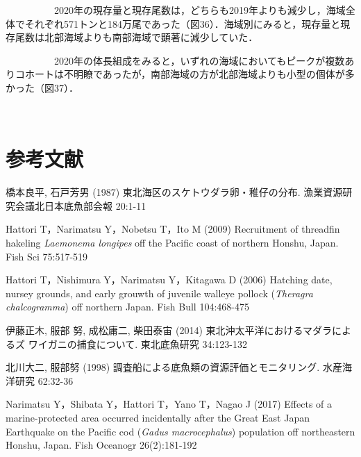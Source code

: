 \documentclass[11pt]{article} %
\begin{document}
\begin{linenumbers}
\ \ \ \ \ \ \ \ \ \ 
2020年の現存量と現存尾数は，どちらも2019年よりも減少し，海域全体でそれぞれ571トンと184万尾であった（図36）．海域別にみると，現存量と現存尾数は北部海域よりも南部海域で顕著に減少していた．


\ \ \ \ \ \ \ \ \ \ 
2020年の体長組成をみると，いずれの海域においてもピークが複数ありコホートは不明瞭であったが，南部海域の方が北部海域よりも小型の個体が多かった（図37）．

\ \ \ \ \ \ \ \ \ \ 
\section{参考文献}
\hangindent=30pt
\noindent
橋本良平, 石戸芳男 (1987) 東北海区のスケトウダラ卵・稚仔の分布. 漁業資源研究会議北日本底魚部会報 20:1-11

\hangindent=30pt
\noindent
Hattori T，Narimatsu Y，Nobetsu T，Ito M (2009) Recruitment of threadfin hakeling \textit{Laemonema longipes} off the Pacific coast of northern Honshu, Japan. Fish Sci 75:517-519

\hangindent=30pt
\noindent
Hattori T，Nishimura Y，Narimatsu Y，Kitagawa D (2006) Hatching date, nursey grounds, and early grouwth of juvenile walleye pollock (\textit{Theragra chalcogramma}) off northern Japan. Fish Bull 104:468-475


\hangindent=30pt
\noindent
伊藤正木, 服部 努, 成松庸二, 柴田泰宙 (2014) 東北沖太平洋におけるマダラによるズ
ワイガニの捕食について. 東北底魚研究 34:123-132

\hangindent=30pt
\noindent
北川大二, 服部努 (1998) 調査船による底魚類の資源評価とモニタリング. 水産海洋研究 62:32-36


\hangindent=30pt
\noindent
Narimatsu Y，Shibata Y，Hattori T，Yano T，Nagao J (2017) Effects of a marine-protected area occurred incidentally after the Great East Japan Earthquake on the Pacific cod (\textit{Gadus macrocephalus}) population off northeastern Honshu, Japan. Fish Oceanogr 26(2):181-192


\end{linenumbers}
\end{document}

